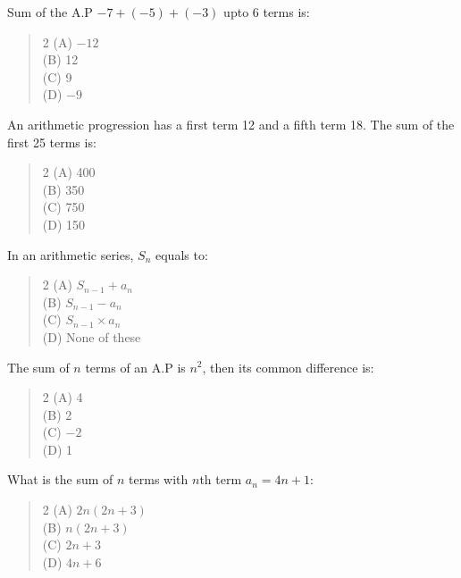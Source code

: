 \documentclass[11pt,a4paper]{article}
\begin{document}
\begin{mcqlist}
\item Sum of the A.P $-7+(-5)+(-3)$ upto 6 terms is:
\begin{quote}\begin{multicols}{2}
\noindent (A) $-12$ \\
(B) 12 \\
(C) 9 \\
(D) $-9$
\end{multicols}\end{quote}

\item An arithmetic progression has a first term 12 and a fifth term 18. The sum of the first 25 terms is:
\begin{quote}\begin{multicols}{2}
\noindent (A) 400 \\
(B) 350 \\
(C) 750 \\
(D) 150
\end{multicols}\end{quote}

\item In an arithmetic series, $S_n$ equals to:
\begin{quote}\begin{multicols}{2}
\noindent (A) $S_{n-1}+a_n$ \\
(B) $S_{n-1}-a_n$ \\
(C) $S_{n-1}\times a_n$ \\
(D) None of these
\end{multicols}\end{quote}

\item The sum of $n$ terms of an A.P is $n^2$, then its common difference is:
\begin{quote}\begin{multicols}{2}
\noindent (A) 4 \\
(B) 2 \\
(C) $-2$ \\
(D) 1
\end{multicols}\end{quote}

\item What is the sum of $n$ terms with $n$th term $a_n=4n+1$:
\begin{quote}\begin{multicols}{2}
\noindent (A) $2n(2n+3)$ \\
(B) $n(2n+3)$ \\
(C) $2n+3$ \\
(D) $4n+6$
\end{multicols}\end{quote}


\end{mcqlist}
\end{document}
